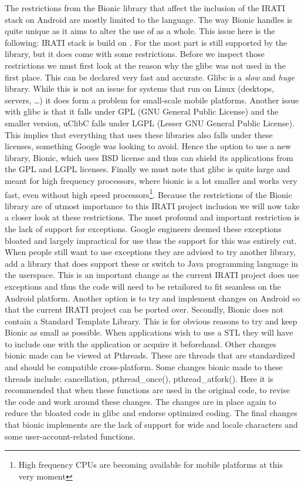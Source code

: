 The restrictions from the Bionic library that affect the inclusion of the IRATI stack on Android are mostly limited to the \cpp language. The way Bionic handles \cpp is quite unique as it aims to alter the use of \cpp as a whole. This issue here is the following: IRATI stack is build on \cpp. For the most part \cpp is still supported by the library, but it does come with some restrictions. Before we inspect those restrictions we must first look at the reason why the glibc was not used in the first place. This can be declared very fast and accurate. Glibc is a \emph{slow} and \emph{huge} library. While this is not an issue for systems that run on Linux (desktops, servers, \ldots) it does form a problem for small-scale mobile platforms. Another issue with glibc is that it falls under GPL (GNU General Public License) and the smaller version, uClibC falls under LGPL (Lesser GNU General Public License). This implies that everything that uses these libraries also falls under these licenses, something Google was looking to avoid. Hence the option to use a new library, Bionic, which uses BSD license and thus can shield its applications from the GPL and LGPL licenses. Finally we must note that glibc is quite large and meant for high frequency processors, where bionic is a lot smaller and works very fast, even without high speed processors\footnote{High frequency CPUs are becoming available for mobile platforms at this very moment}.
\npar
Because the \cpp restrictions of the Bionic library are of utmost importance to this IRATI project inclusion we will now take a closer look at these restrictions. The most profound and important restriction is the lack of support for \cpp exceptions. Google engineers deemed these exceptions bloated and largely impractical for use thus the support for this was entirely cut. When people still want to use exceptions they are advised to try another library, add a library that does support these or switch to Java programming language in the userspace. This is an important change as the current IRATI project does use \cpp exceptions and thus the code will need to be retailored to fit seamless on the Android platform. Another option is to try and implement changes on Android so that the current IRATI project can be ported over. Secondly, Bionic does not contain a \cpp Standard Template Library. This is for obvious reasons to try and keep Bionic as small as possible. When applications wish to use a \cpp STL they will have to include one with the application or acquire it beforehand. Other changes bionic made can be viewed at Pthreads. These are threads that are standardized and should be compatible cross-platform. Some changes bionic made to these threads include: cancellation, pthread\_once(), pthread\_atfork(). Here it is recommended that when these functions are used in the original code, to revise the code and work around these changes. The changes are in place again to reduce the bloated code in glibc and endorse optimized coding. The final changes that bionic implements are the lack of support for wide and locale characters and some user-account-related functions. 

